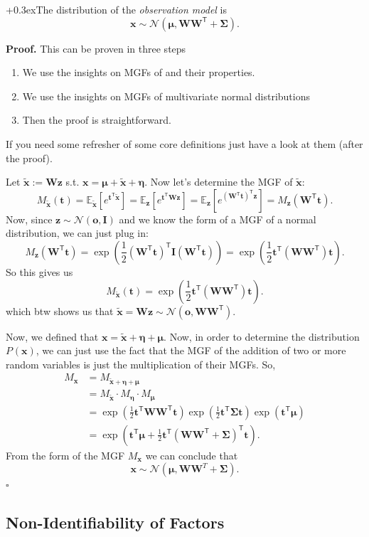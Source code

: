 \documentclass[a2paper,4pt]{extarticle}
\newcommand{\qed}{\hfill$\square$}
\newcommand{\cN}{\mathcal{N}}
\newcommand{\Prob}[2][]{P_{#1}\left( #2 \right)}
\newcommand{\Exp}[2][]{{\mathbb{E}_{#1}}\left[ #2
\right]}
\newcommand*{\T}{\mathsf{T}}
\newcommand{\mat}[1]{\mathbf{#1}}
\renewcommand{\vec}[1]{\mathbf{#1}}
\newcommand{\vo}{\vec{o}}
\newcommand{\vt}{\vec{t}}
\newcommand{\vx}{\vec{x}}
\newcommand{\vz}{\vec{z}}
\newcommand{\vtx}{\widetilde{\vec{x}}}
\newcommand{\veta}{\boldsymbol{\eta}}
\newcommand{\vmu}{\boldsymbol{\mu}}
\newcommand{\MI}{\mat{I}}
\newcommand{\MW}{\mat{W}}
\newcommand{\MSigma}{\mat{\Sigma}}
\newcommand{\customboxpaddingsize}{0pt}
\newcommand{\emptyarg}[1][]{\ifthenelse{\isempty{#1}}{}{\ (#1)}}
\newcommand{\Thm}[1][]{{\setlength\fboxsep{\customboxpaddingsize}
\colorbox{thmcolor}{%
\color{custtitlecolor}{\textbf{T.\emptyarg[#1]}}}\kern+0.3ex}}
\newcommand{\Proof}{\textbf{Proof.} }
\newcommand{\ssep}{\hdashrule[1.1ex]{\linewidth}{0.1pt}{0.3mm}\vspace{-6pt}}
\newcommand{\ssep}{\hdashrule[1.1ex]{\linewidth}{0.1pt}{0.3mm}\vspace{-3pt}}
\begin{document}
\begin{landscape}
\begin{multicols*}{7}
\ssep

\Thm The distribution of the \emph{observation model} is
\[
\vx\sim\cN(\vmu,\MW\MW^\T+\MSigma).
\]

\Proof This can be proven in three steps

\begin{enumerate}
  \item We use the insights on MGFs of and their properties.
  \item We use the insights on MGFs of multivariate normal distributions
  \item Then the proof is straightforward.
\end{enumerate}

If you need some refresher of some core definitions just have a look at them
(after the proof).

Let $\vtx:=\MW\vz$ s.t. $\vx=\vmu+\vtx+\veta$. Now let's determine the MGF of
$\vtx$:
\[
M_{\vtx}(\vt)
=
\Exp[\vtx]{e^{\vt^\T\vtx}}
=
\Exp[\vz]{e^{\vt^\T\MW\vz}}
=
\Exp[\vz]{e^{\left(\MW^\T\vt\right)^\T\vz}}
=
M_{\vz}(\MW^\T\vt).
\]
Now, since $\vz\sim\cN(\vo,\MI)$ and we know the form of a MGF of a normal
distribution, we can just plug in:
\[
M_{\vz}(\MW^\T\vt)
=
\exp\left(\frac{1}{2}(\MW^\T\vt)^\T\MI(\MW^\T\vt)\right)
=
\exp\left(\frac{1}{2}\vt^\T(\MW\MW^\T)\vt\right).
\]
So this gives us
\[
M_{\vtx}(\vt)
=
\exp\left(\frac{1}{2}\vt^\T(\MW\MW^\T)\vt\right).
\]
which btw shows us that $\vtx=\MW\vz\sim\cN(\vo,\MW\MW^\T)$.

Now, we defined that $\vx=\vtx+\veta+\vmu$. Now, in order to determine the
distribution $\Prob{\vx}$, we can just use the fact that the MGF of the addition
of two or more random variables is just the multiplication of their MGFs. So,
\begin{align*}
M_{\vx}
&=
M_{\vtx+\veta+\vmu}
\\
&=
M_{\vtx}
\cdot
M_{\veta}
\cdot
M_{\vmu}
\\
&=
\exp\left(\frac{1}{2}\vt^\T\MW\MW^\T\vt\right)
\exp\left(\frac{1}{2}\vt^\T\MSigma\vt\right)
\exp\left(\vt^\T\vmu\right)
\\
&=
\exp\left(\vt^\T\vmu+\frac{1}{2}\vt^\T(\MW\MW^\T+\MSigma)^\T\vt\right).
\end{align*}
From the form of the MGF $M_\vx$ we can conclude that
\[
\vx\sim\cN(\vmu,\MW\MW^T+\MSigma).
\]
\qed

\subsection{Non-Identifiability of Factors}


\end{multicols*}
\end{landscape}
\end{document}
